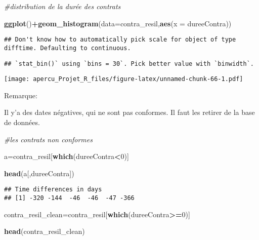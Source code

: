 \documentclass[
]{article}
\newenvironment{Shaded}{\begin{snugshade}}{\end{snugshade}}
\newcommand{\CommentTok}[1]{\textcolor[rgb]{0.56,0.35,0.01}{\textit{#1}}}
\newcommand{\DataTypeTok}[1]{\textcolor[rgb]{0.13,0.29,0.53}{#1}}
\newcommand{\DecValTok}[1]{\textcolor[rgb]{0.00,0.00,0.81}{#1}}
\newcommand{\KeywordTok}[1]{\textcolor[rgb]{0.13,0.29,0.53}{\textbf{#1}}}
\newcommand{\NormalTok}[1]{#1}
\newcommand{\OperatorTok}[1]{\textcolor[rgb]{0.81,0.36,0.00}{\textbf{#1}}}
\begin{document}
\begin{Shaded}
\begin{Highlighting}[]
\CommentTok{#distribution de la durée des contrats}

\KeywordTok{ggplot}\NormalTok{()}\OperatorTok{+}\KeywordTok{geom_histogram}\NormalTok{(}\DataTypeTok{data=}\NormalTok{contra_resil,}\KeywordTok{aes}\NormalTok{(}\DataTypeTok{x =}\NormalTok{ dureeContra))}
\end{Highlighting}
\end{Shaded}

\begin{verbatim}
## Don't know how to automatically pick scale for object of type difftime. Defaulting to continuous.
\end{verbatim}

\begin{verbatim}
## `stat_bin()` using `bins = 30`. Pick better value with `binwidth`.
\end{verbatim}

\texttt{[image: apercu\_Projet\_R\_files/figure-latex/unnamed-chunk-66-1.pdf]}

Remarque:

Il y'a des dates négatives, qui ne sont pas conformes. Il faut les
retirer de la base de données.

\begin{Shaded}
\begin{Highlighting}[]
\CommentTok{#les contrats non conformes}

\NormalTok{a=contra_resil[}\KeywordTok{which}\NormalTok{(dureeContra}\OperatorTok{<}\DecValTok{0}\NormalTok{)]}

\KeywordTok{head}\NormalTok{(a[,dureeContra])}
\end{Highlighting}
\end{Shaded}

\begin{verbatim}
## Time differences in days
## [1] -320 -144  -46  -46  -47 -366
\end{verbatim}

\begin{Shaded}
\begin{Highlighting}[]
\NormalTok{contra_resil_clean=contra_resil[}\KeywordTok{which}\NormalTok{(dureeContra}\OperatorTok{>=}\DecValTok{0}\NormalTok{)]}

\KeywordTok{head}\NormalTok{(contra_resil_clean)}
\end{Highlighting}
\end{Shaded}
\end{document}
